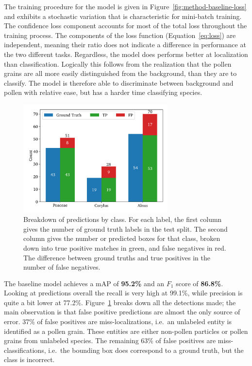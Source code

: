 The training procedure for the model is given in Figure~\ref{fig:method-baseline-loss} and exhibits a stochastic variation that is characteristic for mini-batch training. 
The confidence loss component accounts for most of the total loss throughout the training process.
The components of the loss function (Equation~\ref{eq:loss}) are independent, meaning their ratio does not indicate a difference in performance at the two different tasks.
Regardless, the model does performs better at localization than classification.
Logically this follows from the realization that the pollen grains are all more easily distinguished from the background, than they are to classify.
The model is therefore able to discriminate between background and pollen with relative ease, but has a harder time classifying species.

\begin{figure}[htbp]
    \centering
    \includegraphics[width=0.7\textwidth]{figs/results/baseline/detections_test.pdf}
    \caption[Detections by type by class for the baseline on the test split]{%
Breakdown of predictions by class.
For each label, the first column gives the number of ground truth labels in the test split.
The second column gives the number or predicted boxes for that class, broken down into true positive matches in green, and false negatives in red.
The difference between ground truths and true positives in the number of false negatives. 
    }\label{fig:results-baseline-detections}
  \end{figure}

The baseline model achieves a mAP of \textbf{95.2\%} and an \(F_1\) score of \textbf{86.8\%}.
Looking at predictions overall the recall is very high at 99.1\%, while precision is quite a bit lower at 77.2\%.
Figure~\ref{fig:results-baseline-detections} breaks down all the detections made; the main observation is that false positive predictions are almost the only source of error.
37\% of false positives are miss-localizations, i.e.\ an unlabeled entity is identified as a pollen grain.
These entities are either non-pollen particles or pollen grains from unlabeled species.
The remaining 63\% of false positives are miss-classifications, i.e.\ the bounding box does correspond to a ground truth, but the class is incorrect.

